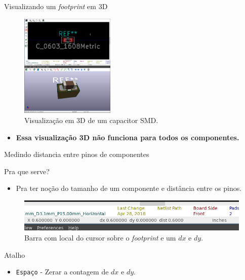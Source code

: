 \documentclass{beamer}
\begin{document}
\begin{frame}{Visualizando um \textit{footprint} em 3D}
	\begin{figure}
		\centering
		\includegraphics[width=0.4\textwidth]{Imagens/21_view_3d_janela.png}
		\caption{Visualização em 3D de um capacitor SMD.}
	\end{figure}
	\pause
	\begin{itemize}
		\item \textbf{Essa visualização 3D não funciona para todos os componentes.}
	\end{itemize}
\end{frame}

\begin{frame}{Medindo distancia entre pinos de componentes}
	\begin{block}{Pra que serve?}
		\begin{itemize}
			\item Pra ter noção do tamanho de um componente e distância entre os pinos.			
		\end{itemize}
	\end{block}
	\pause
	\begin{figure}
		\centering
		\includegraphics[width=1\textwidth]{Imagens/22_medindo_distancias.png}
		\caption{Barra com local do cursor sobre o \textit{footprint} e um $dx$ e $dy$.}
	\end{figure}
	\pause
	\begin{block}{Atalho}
		\begin{itemize}
			\item \texttt{Espaço} - Zerar a contagem de $dx$ e $dy$.
		\end{itemize}
	\end{block}
\end{frame}
\end{document}
